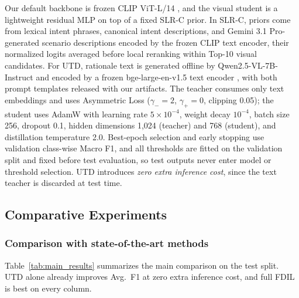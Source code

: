 Our default backbone is frozen CLIP ViT-L/14 \cite{radford_learning_2021}, and the visual student is a lightweight residual MLP on top of a fixed SLR-C prior. In SLR-C, priors come from lexical intent phrases, canonical intent descriptions, and Gemini 3.1 Pro-generated scenario descriptions \cite{team_gemini_2025} encoded by the frozen CLIP text encoder, their normalized logits averaged before local reranking within Top-10 visual candidates. For UTD, rationale text is generated offline by Qwen2.5-VL-7B-Instruct \cite{bai_qwen25-vl_2025} and encoded by a frozen bge-large-en-v1.5 text encoder \cite{xiao_c-pack_2024}, with both prompt templates released with our artifacts. The teacher consumes only text embeddings and uses Asymmetric Loss \cite{ridnik_asymmetric_2021} ($\gamma_{-}=2$, $\gamma_{+}=0$, clipping 0.05); the student uses AdamW \cite{loshchilov_decoupled_2018} with learning rate $5\times10^{-4}$, weight decay $10^{-4}$, batch size 256, dropout 0.1, hidden dimensions 1,024 (teacher) and 768 (student), and distillation temperature 2.0. Best-epoch selection and early stopping use validation class-wise Macro F1, and all thresholds are fitted on the validation split and fixed before test evaluation, so test outputs never enter model or threshold selection. UTD introduces \emph{zero extra inference cost}, since the text teacher is discarded at test time.

\subsection{Comparative Experiments}

\subsubsection{Comparison with state-of-the-art methods}
\label{sec:sota_comparison}

Table~\ref{tab:main_results} summarizes the main comparison on the test split.  UTD alone already improves Avg.\ F1 at zero extra inference cost, and full FDIL is best on every column.

